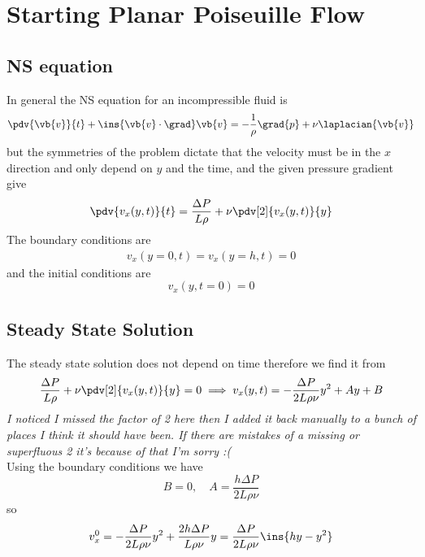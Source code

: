 \clearpage
\section{Starting Planar Poiseuille Flow}
\subsection{NS equation}
In general the NS equation for an incompressible fluid is 
\begin{equation}
	\pdv{\vb{v}}{t}+\ins{\vb{v}\cdot\grad}\vb{v}=-\frac{1}{\rho}\grad{p}+\nu\laplacian{\vb{v}}
\end{equation}
but the symmetries of the problem dictate that the velocity must be in the \(x\) direction and only depend on \(y\) and the time, and the given pressure gradient give 
\begin{equation}
	\pdv{v_x(y,t)}{t}=\frac{\Delta P}{L\rho}+\nu\pdv[2]{v_x(y,t)}{y}
\end{equation}
The boundary conditions are
\begin{align}
	v_x(y=0,t) = v_x(y=h,t)=0
\end{align}
and the initial conditions are 
\begin{equation}
	v_x(y,t=0)=0
\end{equation}
\subsection{Steady State Solution}
The steady state solution does not depend on time therefore we find it from
\begin{equation}
	\frac{\Delta P}{L\rho}+\nu\pdv[2]{v_x(y,t)}{y}=0 \implies v_x(y,t) = -\frac{\Delta P}{2L\rho\nu}y^2+Ay+B
\end{equation}
\emph{I noticed I missed the factor of 2 here then I added it back manually to a bunch of places I think it should have been. If there are mistakes of a missing or superfluous 2 it's because of that I'm sorry :(} \\Using the boundary conditions we have 
\begin{equation}
	B=0,\quad A=\frac{h\Delta P}{2L\rho\nu}
\end{equation}
so 
\begin{equation}
	v_x^0 = -\frac{\Delta P}{2L\rho\nu}y^2+\frac{2h\Delta P}{L\rho\nu}y = \frac{\Delta P}{2L\rho\nu}\ins{hy-y^2}
\end{equation}
